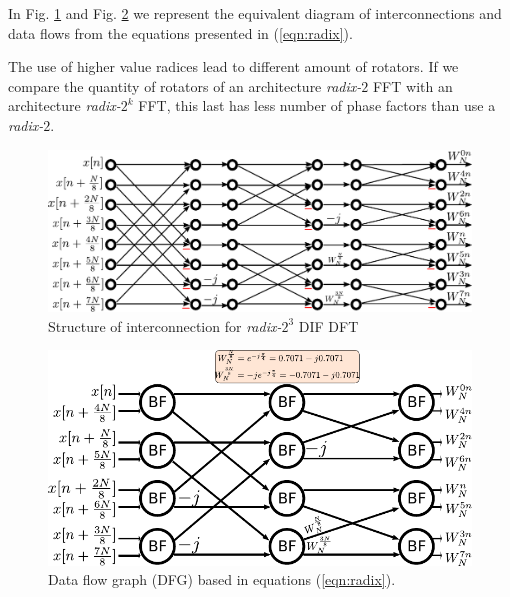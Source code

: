\documentclass[journal,comsoc]{IEEEtran}
\begin{document}
In Fig. \ref{fig:8puntosradix8conexion} and Fig. \ref{fig:8puntosradix8burbujas} we represent the equivalent diagram of interconnections and data flows from the equations presented in (\ref{eqn:radix}).

The use of higher value radices lead to different amount of rotators. If we compare the quantity of rotators of an architecture \textit{radix-}$2$ FFT with an architecture \textit{radix-}$2^k$ FFT, this last has less number of phase factors than use a \textit{radix-}$2$.
\\

\begin{figure}[!t]
	\centering
	\includegraphics[width=0.95\linewidth]{Diagramas/miSeccionFiguras/8PuntosRadix8Conexion.pdf}
	\caption{Structure of interconnection for \textit{radix-}$2^3$ DIF DFT}
	\label{fig:8puntosradix8conexion}
\end{figure}
\begin{figure}[t!]
	\centering
	\includegraphics[width=0.97\linewidth]{Diagramas/miSeccionFiguras/8PuntosRadix8Burbujas.pdf}
	\caption{Data flow graph (DFG) based in equations (\ref{eqn:radix}).}
	\label{fig:8puntosradix8burbujas}
\end{figure}
\end{document}
